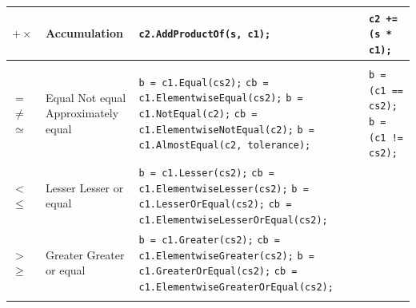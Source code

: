 \documentclass[letterpaper,10pt]{article}
\newcommand{\doublehlinefour}{\hline & & & \\ [-10pt] \hline}
\begin{document}
\begin{center}
\begin{tabular}{|p{0.6in}|p{1.9in}|p{3.1in}|p{1.3in}|}
          $+\times$
          &
          Accumulation
          &
          \texttt{c2.AddProductOf(s, c1);}
          &
          \texttt{c2 += (s * c1);}
          \\
          \doublehlinefour

          $=$ \newline \newline
          $\neq$ \newline \newline
          $\simeq$
          &
          Equal \newline
          \newline
          Not equal \newline
          \newline
          Approximately equal
          &
          \texttt{b = c1.Equal(cs2);} \newline
          \texttt{cb = c1.ElementwiseEqual(cs2);} \newline
          \texttt{b = c1.NotEqual(c2);} \newline
          \texttt{cb = c1.ElementwiseNotEqual(c2);} \newline
          \texttt{b = c1.AlmostEqual(c2, tolerance);}
          &
          \texttt{b = (c1 == cs2);} \newline \newline
          \texttt{b = (c1 != cs2);}
          \\
          \hline
          
          $<$ \newline \newline
          $\leq$
          &
          Lesser \newline \newline
          Lesser or equal
          &
          \texttt{b = c1.Lesser(cs2);} \newline
          \texttt{cb = c1.ElementwiseLesser(cs2);} \newline
          \texttt{b = c1.LesserOrEqual(cs2);} \newline
          \texttt{cb = c1.ElementwiseLesserOrEqual(cs2);}
          &
          \\
          \hline

          $>$ \newline \newline
          $\geq$
          &
          Greater \newline \newline
          Greater or equal
          &
          \texttt{b = c1.Greater(cs2);} \newline
          \texttt{cb = c1.ElementwiseGreater(cs2);} \newline
          \texttt{b = c1.GreaterOrEqual(cs2);} \newline
          \texttt{cb = c1.ElementwiseGreaterOrEqual(cs2);}
          &
          \\
          \doublehlinefour


\end{tabular}
\end{center}
\end{document}
